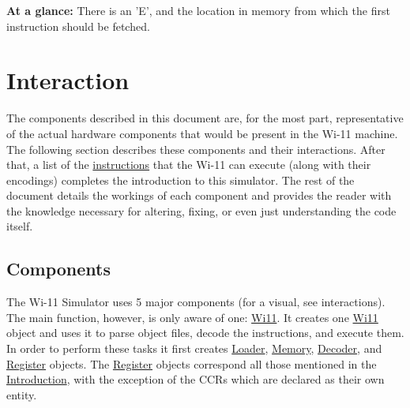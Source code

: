 \begin{DoxyParagraph}{}
{\bfseries At a glance:} There is an 'E', and the location in memory from which the first instruction should be fetched.
\end{DoxyParagraph}
\hypertarget{index_Component}{}\section{Interaction}\label{index_Component}
The components described in this document are, for the most part, representative of the actual hardware components that would be present in the Wi-\/11 machine. The following section describes these components and their interactions. After that, a list of the \hyperlink{index_instructions}{instructions} that the Wi-\/11 can execute (along with their encodings) completes the introduction to this simulator. The rest of the document details the workings of each component and provides the reader with the knowledge necessary for altering, fixing, or even just understanding the code itself.\hypertarget{index_components}{}\subsection{Components}\label{index_components}
The Wi-\/11 Simulator uses 5 major components (for a visual, see interactions). The main function, however, is only aware of one: \hyperlink{classWi11}{Wi11}. It creates one \hyperlink{classWi11}{Wi11} object and uses it to parse object files, decode the instructions, and execute them. In order to perform these tasks it first creates \hyperlink{classLoader}{Loader}, \hyperlink{classMemory}{Memory}, \hyperlink{classDecoder}{Decoder}, and \hyperlink{classRegister}{Register} objects. The \hyperlink{classRegister}{Register} objects correspond all those mentioned in the \hyperlink{index_intro}{Introduction}, with the exception of the CCRs which are declared as their own entity.

